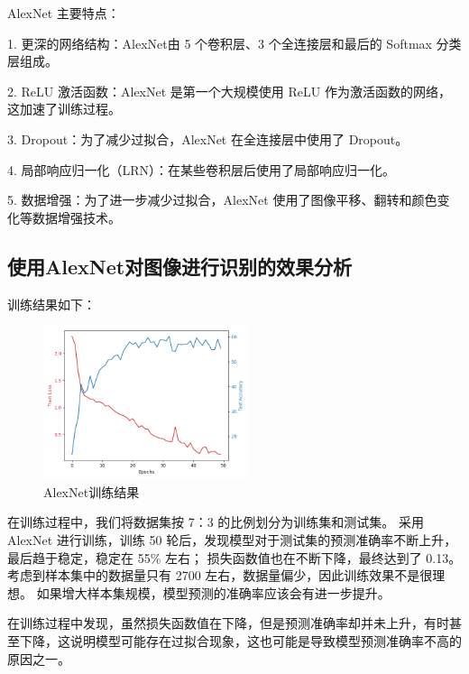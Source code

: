 \documentclass[UTF8]{ctexart}
\begin{document}
AlexNet 主要特点：\par
1. 更深的网络结构：AlexNet由 5 个卷积层、3 个全连接层和最后的 Softmax 分类层组成。 \par
2. ReLU 激活函数：AlexNet 是第一个大规模使用 ReLU 作为激活函数的网络，这加速了训练过程。 \par
3. Dropout：为了减少过拟合，AlexNet 在全连接层中使用了 Dropout。 \par
4. 局部响应归一化（LRN）：在某些卷积层后使用了局部响应归一化。 \par
5. 数据增强：为了进一步减少过拟合，AlexNet 使用了图像平移、翻转和颜色变化等数据增强技术。 \par

\subsection{使用AlexNet对图像进行识别的效果分析}

训练结果如下：

\begin{figure}[H]
    \centering %
    \includegraphics[height=4.5cm]{../AlexNet/AlexNet.png}
    \caption{AlexNet训练结果}
\end{figure}

在训练过程中，我们将数据集按 7：3 的比例划分为训练集和测试集。
采用 AlexNet 进行训练，训练 50 轮后，发现模型对于测试集的预测准确率不断上升，最后趋于稳定，稳定在 55\% 左右；
损失函数值也在不断下降，最终达到了 0.13。考虑到样本集中的数据量只有 2700 左右，数据量偏少，因此训练效果不是很理想。
如果增大样本集规模，模型预测的准确率应该会有进一步提升。 \par
在训练过程中发现，虽然损失函数值在下降，但是预测准确率却并未上升，有时甚至下降，这说明模型可能存在过拟合现象，这也可能是导致模型预测准确率不高的原因之一。

\newpage
\small


\end{document}
